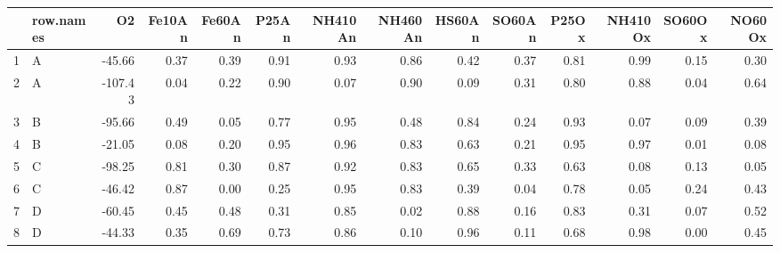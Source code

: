 \begin{table}[ht]
\centering
\begin{tabular}{rlrrrrrrrrrrrr}
  \hline
 & row.names & O2 & Fe10An & Fe60An & P25An & NH410An & NH460An & HS60An & SO60An & P25Ox & NH410Ox & SO60Ox & NO60Ox \\ 
  \hline
1 & A & -45.66 & 0.37 & 0.39 & 0.91 & 0.93 & 0.86 & 0.42 & 0.37 & 0.81 & 0.99 & 0.15 & 0.30 \\ 
  2 & A & -107.43 & 0.04 & 0.22 & 0.90 & 0.07 & 0.90 & 0.09 & 0.31 & 0.80 & 0.88 & 0.04 & 0.64 \\ 
  3 & B & -95.66 & 0.49 & 0.05 & 0.77 & 0.95 & 0.48 & 0.84 & 0.24 & 0.93 & 0.07 & 0.09 & 0.39 \\ 
  4 & B & -21.05 & 0.08 & 0.20 & 0.95 & 0.96 & 0.83 & 0.63 & 0.21 & 0.95 & 0.97 & 0.01 & 0.08 \\ 
  5 & C & -98.25 & 0.81 & 0.30 & 0.87 & 0.92 & 0.83 & 0.65 & 0.33 & 0.63 & 0.08 & 0.13 & 0.05 \\ 
  6 & C & -46.42 & 0.87 & 0.00 & 0.25 & 0.95 & 0.83 & 0.39 & 0.04 & 0.78 & 0.05 & 0.24 & 0.43 \\ 
  7 & D & -60.45 & 0.45 & 0.48 & 0.31 & 0.85 & 0.02 & 0.88 & 0.16 & 0.83 & 0.31 & 0.07 & 0.52 \\ 
  8 & D & -44.33 & 0.35 & 0.69 & 0.73 & 0.86 & 0.10 & 0.96 & 0.11 & 0.68 & 0.98 & 0.00 & 0.45 \\ 
   \hline
\end{tabular}
\end{table}
